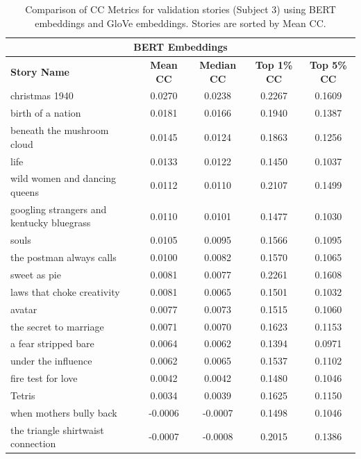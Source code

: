 \documentclass{article}
\begin{document}
\begin{table}[H] 
  \centering
  \caption{Comparison of CC Metrics for validation stories (Subject 3) using BERT embeddings and GloVe embeddings. Stories are sorted by Mean CC.}
  \label{tab:story_cc_metrics_comparison}
  \begin{tabular}{lcccc}
    \hline
    \multicolumn{5}{c}{\textbf{BERT Embeddings}} \\
    \hline
    \textbf{Story Name} & \textbf{Mean CC} & \textbf{Median CC} & \textbf{Top 1\% CC} & \textbf{Top 5\% CC} \\
    \hline
    christmas 1940              & 0.0270 & 0.0238 & 0.2267 & 0.1609 \\
    birth of a nation           & 0.0181 & 0.0166 & 0.1940 & 0.1387 \\
    beneath the mushroom cloud  & 0.0145 & 0.0124 & 0.1863 & 0.1256 \\
    life                        & 0.0133 & 0.0122 & 0.1450 & 0.1037 \\
    wild women and dancing queens & 0.0112 & 0.0110 & 0.2107 & 0.1499 \\
    googling strangers and kentucky bluegrass & 0.0110 & 0.0101 & 0.1477 & 0.1030 \\
    souls                       & 0.0105 & 0.0095 & 0.1566 & 0.1095 \\
    the postman always calls    & 0.0100 & 0.0082 & 0.1570 & 0.1065 \\
    sweet as pie                & 0.0081 & 0.0077 & 0.2261 & 0.1608 \\
    laws that choke creativity  & 0.0081 & 0.0065 & 0.1501 & 0.1032 \\
    avatar                      & 0.0077 & 0.0073 & 0.1515 & 0.1060 \\
    the secret to marriage      & 0.0071 & 0.0070 & 0.1623 & 0.1153 \\
    a fear stripped bare        & 0.0064 & 0.0062 & 0.1394 & 0.0971 \\
    under the influence         & 0.0062 & 0.0065 & 0.1537 & 0.1102 \\
    fire test for love          & 0.0042 & 0.0042 & 0.1480 & 0.1046 \\
    Tetris                      & 0.0034 & 0.0039 & 0.1625 & 0.1150 \\
    when mothers bully back     & -0.0006 & -0.0007 & 0.1498 & 0.1046 \\
    the triangle shirtwaist connection & -0.0007 & -0.0008 & 0.2015 & 0.1386 \\

\end{tabular}
\end{table}
\end{document}
